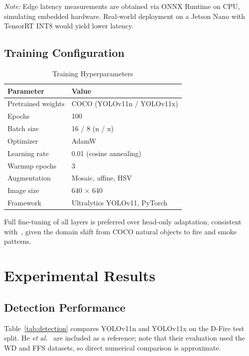 \documentclass[conference]{IEEEtran}
\begin{document}
\textit{Note:} Edge latency measurements are obtained via ONNX Runtime
on CPU, simulating embedded hardware. Real-world deployment on a Jetson
Nano with TensorRT INT8 would yield lower latency.

\subsection{Training Configuration}

\begin{table}[h]
\caption{Training Hyperparameters}
\label{tab:training}
\centering
\begin{tabular}{ll}
\toprule
\textbf{Parameter} & \textbf{Value} \\
\midrule
Pretrained weights  & COCO (YOLOv11n / YOLOv11x) \\
Epochs              & 100 \\
Batch size          & 16 / 8 (n / x) \\
Optimizer           & AdamW \\
Learning rate       & 0.01 (cosine annealing) \\
Warmup epochs       & 3 \\
Augmentation        & Mosaic, affine, HSV \\
Image size          & 640 $\times$ 640 \\
Framework           & Ultralytics YOLOv11, PyTorch \\
\bottomrule
\end{tabular}
\end{table}

Full fine-tuning of all layers is preferred over head-only adaptation,
consistent with~\cite{sathishkumar2023forest}, given the domain shift
from COCO natural objects to fire and smoke patterns.

\section{Experimental Results}
\label{sec:results}

\subsection{Detection Performance}

Table~\ref{tab:detection} compares YOLOv11n and YOLOv11x on the D-Fire
test split. He \textit{et al.}~\cite{he2025yolov11} are included as a
reference; note that their evaluation used the WD and FFS datasets, so
direct numerical comparison is approximate.
\end{document}
